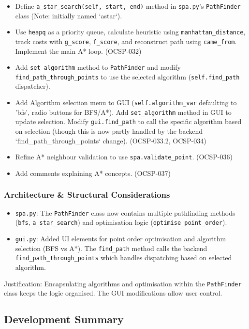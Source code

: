 \begin{enumerate}
	\begin{itemize}
		\item Define \verb|a_star_search(self, start, end)| method in \verb|spa.py|'s \verb|PathFinder| class (Note: initially named `astar`).
		\item Use \verb|heapq| as a priority queue, calculate heuristic using \verb|manhattan_distance|, track costs with \verb|g_score|, \verb|f_score|, and reconstruct path using \verb|came_from|. Implement the main A* loop. (OCSP-032)
		\item Add \verb|set_algorithm| method to \verb|PathFinder| and modify \verb|find_path_through_points| to use the selected algorithm (\verb|self.find_path| dispatcher).
		\item Add Algorithm selection menu to GUI (\verb|self.algorithm_var| defaulting to 'bfs', radio buttons for BFS/A*). Add \verb|set_algorithm| method in GUI to update selection. Modify \verb|gui.find_path| to call the specific algorithm based on selection (though this is now partly handled by the backend `find_path_through_points` change). (OCSP-033.2, OCSP-034)
		\item Refine A* neighbour validation to use \verb|spa.validate_point|. (OCSP-036)
		\item Add comments explaining A* concepts. (OCSP-037)
	\end{itemize}
\end{enumerate}

\subsubsection{Architecture \& Structural Considerations}
\begin{itemize}
	\item \verb|spa.py|: The \verb|PathFinder| class now contains multiple pathfinding methods (\verb|bfs|, \verb|a_star_search|) and optimisation logic (\verb|optimise_point_order|).
	\item \verb|gui.py|: Added UI elements for point order optimisation and algorithm selection (BFS vs A*). The \verb|find_path| method calls the backend \verb|find_path_through_points| which handles dispatching based on selected algorithm.
\end{itemize}
Justification: Encapsulating algorithms and optimisation within the \verb|PathFinder| class keeps the logic organised. The GUI modifications allow user control.

\newpage
\subsection{Development Summary}

